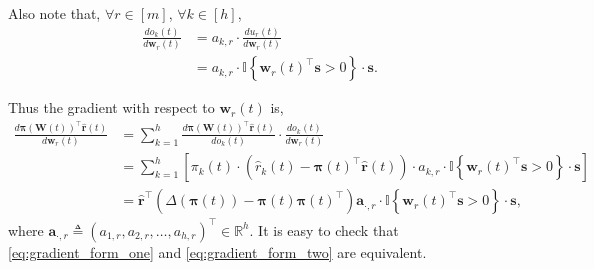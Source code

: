 \documentclass[10pt]{article}
\def\rva{{\mathbf{a}}}
\def\rvr{{\mathbf{r}}}
\def\rvs{{\mathbf{s}}}
\def\rvw{{\mathbf{w}}}
\def\rvpi{{\boldsymbol{\pi}}}
\def\rmW{{\mathbf{W}}}
\def\sR{{\mathbb{R}}}
\def\sI{{\mathbb{I}}}
\begin{document}
\noindent Also note that, $\forall r \in [m]$, $\forall k \in [h]$,
\begin{equation*}
\begin{split}
    \frac{d o_k(t)}{d \rvw_r(t)} &= a_{k,r} \cdot \frac{d u_{r}(t)}{d \rvw_r(t)} \\
    &= a_{k,r} \cdot \sI\left\{ \rvw_r(t)^\top \rvs > 0 \right\} \cdot \rvs.
\end{split}
\end{equation*}

\noindent Thus the gradient with respect to $\rvw_r(t)$ is,
\begin{equation}
\label{eq:gradient_form_two}
\begin{split}
    \frac{d \rvpi\left( \rmW(t) \right)^\top \hat{\rvr}\left(t\right)}{d \rvw_r(t)} &=  \sum\limits_{k=1}^{h}{ \frac{d \rvpi\left( \rmW(t) \right)^\top \hat{\rvr}\left(t\right)}{d o_k(t)} \cdot \frac{d o_k(t)}{d \rvw_r(t)} }  \\
    &= \sum\limits_{k=1}^{h}{ \left[ \pi_k(t) \cdot \left( \hat{r}_{k}\left(t\right) - \rvpi(t)^\top \hat{\rvr}\left(t\right) \right) \cdot a_{k,r} \cdot \sI\left\{ \rvw_r(t)^\top \rvs > 0 \right\} \cdot \rvs  \right] } \\
    &= \hat{\rvr}^\top \left( \Delta\left( \rvpi(t) \right) - \rvpi(t) \rvpi(t)^\top \right) \rva_{\cdot, r} \cdot \sI\left\{ \rvw_r(t)^\top \rvs > 0 \right\} \cdot \rvs,
\end{split}
\end{equation}
where $\rva_{\cdot, r} \triangleq \left( a_{1,r}, a_{2,r}, \dots, a_{h,r} \right)^\top \in \sR^h$. It is easy to check that \cref{eq:gradient_form_one} and \cref{eq:gradient_form_two} are equivalent.
\end{document}
